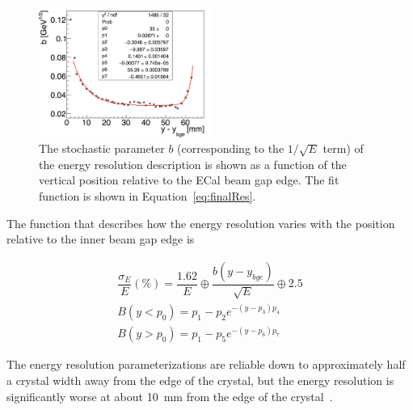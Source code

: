 \begin{figure}[htb]
  \centering
      \includegraphics[width=0.5\textwidth]{pics/performance/eResEdgeEffect.png}
  \caption[Characterization of the energy resolution edge effects ]{The stochastic parameter $b$ (corresponding to the $1/\sqrt{E}$ term) of the energy resolution description is shown as a function of the vertical position relative to the ECal beam gap edge. The fit function is shown in Equation~\eqref{eq:finalRes}.}
  \label{Figure:stochasticEdge}
\end{figure}

The function that describes how the energy resolution varies with the position relative to the inner beam gap edge is 

\begin{equation}
\begin{split}
\label{eq:finalRes}
\dfrac{\sigma_E}{E}(\%)=\dfrac{1.62}{E}\oplus \dfrac{b(y-y_{bge})}{\sqrt{E}} \oplus 2.5 \\
B(y<p_0) = p_1-p_2 e^{-(y-p_3)p_4}\\
B(y>p_0) = p_1-p_5 e^{-(y-p_6)p_7}
\end{split}
\end{equation}

The energy resolution parameterizations are reliable down to approximately half a crystal width away from the edge of the crystal, but the energy resolution is significantly worse at about 10~mm from the edge of the crystal~\cite{szumila-vance_hps_2016}.
